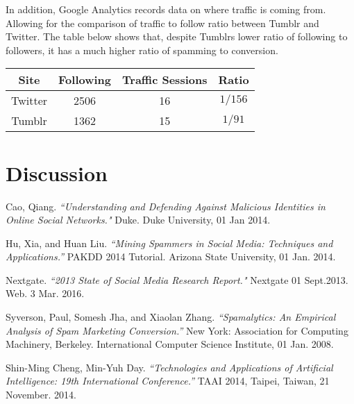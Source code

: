 \documentclass{article}
\begin{document}
\vspace{0.5in}

\noindent
In addition, Google Analytics records data on where traffic is coming from. Allowing for the comparison of traffic to follow ratio between Tumblr and Twitter. The table below shows that, despite Tumblrs lower ratio of following to followers, it has a much higher ratio of spamming to conversion. 

\begin{center}
\begin{tabular}{| c | c | c | c |}
  \hline
  Site & Following & Traffic Sessions & Ratio \\
  \hline
  Twitter & 2506 & 16 & $1/156$\\
  Tumblr & 1362 & 15 & $1/91$\\
  
  \hline
\end{tabular}
\end{center}

\newpage
\section{Discussion}
\newpage
\begin{thebibliography}{9}
Cao, Qiang. 
\textit{``Understanding and Defending Against Malicious Identities in Online Social 
Networks."} 
Duke. Duke University, 01 Jan 2014.

 Hu, Xia, and Huan Liu.
 \textit{``Mining Spammers in Social Media: Techniques and Applications.'' }
PAKDD 2014 Tutorial. Arizona State University, 01 Jan. 2014.

Nextgate.
\textit{``2013 State of Social Media Research Report."} 
Nextgate 01 Sept.2013. Web. 3 Mar. 2016.

Syverson, Paul, Somesh Jha, and Xiaolan Zhang.
\textit{``Spamalytics: An Empirical Analysis of Spam Marketing Conversion.''} 
New York: Association for Computing Machinery, Berkeley. International Computer Science Institute, 01 Jan. 2008.

Shin-Ming Cheng, Min-Yuh Day.
\textit{``Technologies and Applications of Artificial Intelligence: 19th International Conference.''}
TAAI 2014, Taipei, Taiwan, 21 November. 2014.
 
 
\end{thebibliography}
\end{document}
